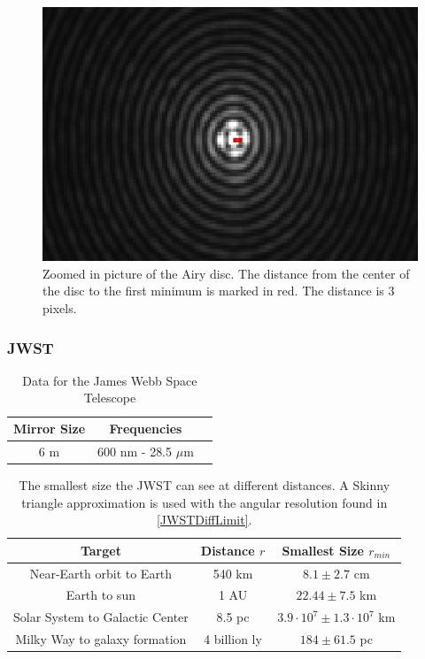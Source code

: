 \documentclass{emulateapj}
\begin{document}
\begin{figure}[H]
\centering
\includegraphics[scale=0.4]{Airy3zoomed2.png}
\caption{Zoomed in picture of the Airy disc. The distance from the center of the disc to the first minimum is marked in red. The distance is 3 pixels.}
\end{figure}\label{fig:airy}

\subsubsection{JWST}
\begin{table}[H]
\centering
\begin{tabular}{ c c c }
Mirror Size & Frequencies \\
\hline
6 m & 600 nm - 28.5 $\mu$m 
\end{tabular}
\caption{Data for the James Webb Space Telescope}
\end{table}\label{tab:dataJWST}

\begin{table}[H]
\centering
\begin{tabular}{ c c c }
Target & Distance $r$ & Smallest Size $r_{min}$ \\
\hline
Near-Earth orbit to Earth & 540 km &$8.1 \pm 2.7$ cm \\
Earth to sun & 1 AU & $22.44 \pm 7.5$ km \\
Solar System to Galactic Center & 8.5 pc & $3.9\cdot 10^7 \pm 1.3\cdot 10^7$ km \\
Milky Way to galaxy formation &  4 billion ly & $184 \pm 61.5$ pc 
\end{tabular}
\caption{The smallest size the JWST can see at different distances. A Skinny triangle approximation is used with the angular resolution found in \eqref{JWSTDiffLimit}.}
\end{table}\label{tab:visionJWST}
\end{document}
